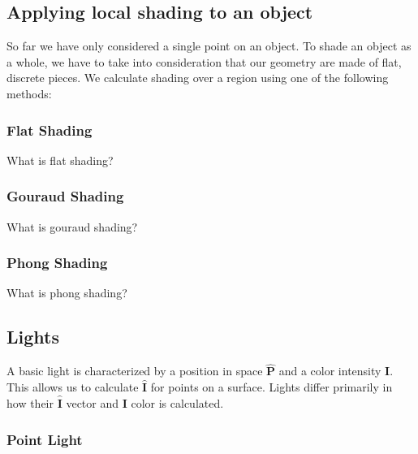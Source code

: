 \documentclass[]{article}
\begin{document}
\pagebreak
 
\subsection{Applying local shading to an object}

So far we have only considered a single point on an object. To shade an object as a whole, we have to take into consideration that our geometry are made of flat, discrete pieces. We calculate shading over a region using one of the following methods:

\subsubsection{Flat Shading}

What is flat shading? 
\textwidth{\hrulefill} 
\\

\textwidth{\hrulefill}

\subsubsection{Gouraud Shading}

What is gouraud shading? 
\textwidth{\hrulefill} 
\\

\textwidth{\hrulefill}

\subsubsection{Phong Shading} 

What is phong shading? 
\textwidth{\hrulefill} 
\\

\textwidth{\hrulefill}
 
\subsection{Lights}\label{lights}

A basic light is characterized by a position in space $\hat{\mathbf{P}}$ and a color intensity $\mathbf{I}$. This allows us to calculate $\hat{\mathbf{I}}$ for points on a surface. Lights differ primarily in how their $\hat{\mathbf{I}}$ vector and $\mathbf{I}$ color is calculated.

\subsubsection{Point Light}
\end{document}

